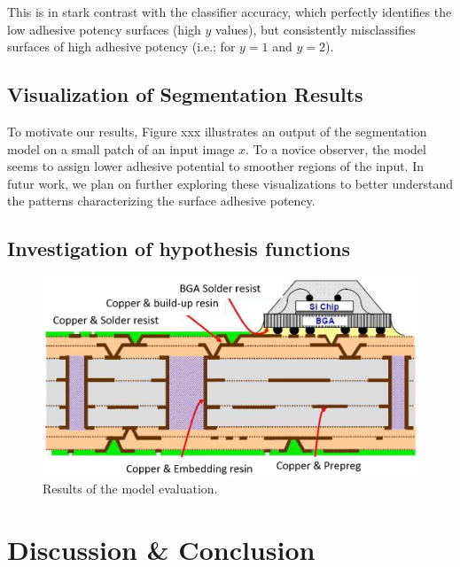 \documentclass[10pt,twocolumn,letterpaper]{article}
\begin{document}
This is in stark contrast with the classifier accuracy, which perfectly identifies
the low adhesive potency surfaces (high $y$ values), but consistently misclassifies 
surfaces of high adhesive potency (i.e.; for $y=1$ and $y=2$).

\subsection{Visualization of Segmentation Results}

To motivate our results, Figure xxx illustrates an output of the segmentation model on a small patch of an input image $x$.
To a novice observer, the model seems to assign lower adhesive potential to smoother regions of the input.
In futur work, we plan on further exploring these visualizations to better understand the 
patterns characterizing the surface adhesive potency.


\subsection{Investigation of hypothesis functions}



\begin{figure}[h]
	\centering
	\includegraphics[width=0.9\linewidth]{"./figures/Figure1"}
	\caption{
		Results of the model evaluation.
	}
\end{figure}




\section{Discussion \& Conclusion}





















{\small


}
\end{document}
